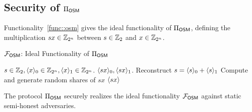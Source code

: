 \subsection{Security of 
\texorpdfstring{$\Pi_{\mathsf{OSM}}$}{πOSM}
} 
\label{sec::proof_sxb}


Functionality~\ref{func::osm} gives the ideal functionality of $\Pi_{\mathsf{OSM}}$, defining the multiplication $sx\in\mathbb{Z}_{2^n}$ between %
$s\in\mathbb{Z}_2$ and %
$x\in\mathbb{Z}_{2^n}$.

\begin{functionality}[!t]
	\caption{$\mathcal{F}_{\mathsf{OSM}}$: Ideal Functionality of $\Pi_{\mathsf{OSM}}$}\label{func::osm}
\begin{algorithmic}[1]
	\REQUIRE $s\in\mathbb{Z}_2, \langle x\rangle_0\in\mathbb{Z}_{2^n}, \langle x\rangle_1\in\mathbb{Z}_{2^n}$.
	\ENSURE $\langle sx \rangle_0, \langle sx \rangle_1$.
	\STATE Reconstruct $s=\langle s\rangle_0+\langle s\rangle_1$
	\STATE Compute and generate random shares of $sx$
	\RETURN $\langle sx \rangle$
\end{algorithmic}
\end{functionality}

\begin{theorem}
\label{the::osm}
	The protocol $\Pi_{\mathsf{OSM}}$ securely realizes the ideal functionality $\mathcal{F}_{\mathsf{OSM}}$ against static semi-honest adversaries.
\end{theorem}

